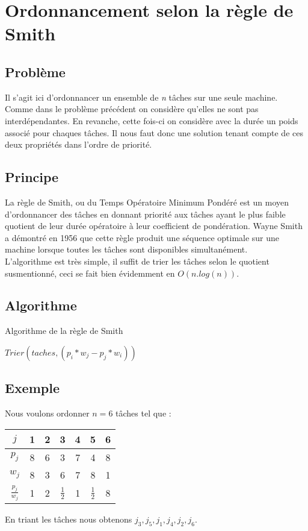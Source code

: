 \section{Ordonnancement selon la règle de Smith}
\subsection{Problème}
Il s'agit ici d'ordonnancer un ensemble de {\em n} tâches sur une seule machine.
Comme dans le problème précédent on considère qu'elles ne sont pas
interdépendantes. En revanche, cette fois-ci on considère avec la durée un poids
associé pour chaques tâches. Il nous faut donc une solution tenant compte de ces
deux propriétés dans l'ordre de priorité. 
 
\subsection{Principe}
La règle de Smith, ou du Temps Opératoire Minimum Pondéré est un moyen 
d'ordonnancer des tâches en donnant priorité aux tâches ayant le plus faible 
quotient de leur durée opératoire à leur coefficient de pondération. Wayne Smith 
a démontré en 1956 que cette règle produit une séquence optimale sur une machine 
lorsque toutes les tâches sont disponibles simultanément.\\
L'algorithme est très simple, il suffit de trier les tâches selon le quotient 
susmentionné, ceci se fait bien évidemment en $O(n.log(n))$.

\subsection{Algorithme}
\begin{algorithm}
\caption{Algorithme de la règle de Smith}
\begin{algorithmic}
\STATE $Trier(taches, (p_i*w_j - p_j*w_i))$
\end{algorithmic}
\end{algorithm}

\subsection{Exemple}
Nous voulons ordonner $n = 6$ tâches tel que :
\begin{center}
\begin{tabular}{|c|c|c|c|c|c|c|}
\hline
$j$ & 1 & 2 & 3 & 4 & 5 & 6  \\
\hline
$p_j$ & 8 & 6 & 3 & 7 & 4 & 8  \\
$w_j$ & 8 & 3 & 6 & 7 & 8 & 1  \\
\hline
$\frac{p_j}{w_j}$ & 1 & 2 & $\frac{1}{2}$ & 1 & $\frac{1}{2}$ & 8 \\
\hline
\end{tabular}
\end{center}
En triant les tâches nous obtenons $j_3,j_5,j_1,j_4,j_2,j_6$.

